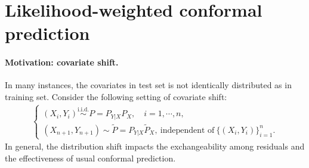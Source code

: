 \documentclass{article}
\numberwithin{equation}{section}
\begin{document}
\section{Likelihood-weighted conformal prediction}
\paragraph{Motivation: covariate shift.} In many instances, the covariates in test set is not identically distributed as in training set. Consider the following setting of covariate shift:
\begin{align*}
	\begin{cases}
		(X_i,Y_i)\overset{\mathrm{i.i.d.}}{\sim} P = P_{Y|X}P_X,\quad i=1,\cdots,n,\\
		(X_{n+1},Y_{n+1})\sim \widetilde{P} = P_{Y|X}\widetilde{P}_X,\ \text{independent of}\ \{(X_i,Y_i)\}_{i=1}^n.
	\end{cases}\tag{5.1}\label{5.1}
\end{align*}
In general, the distribution shift impacts the exchangeability among residuals and the effectiveness of usual conformal prediction.
\end{document}
